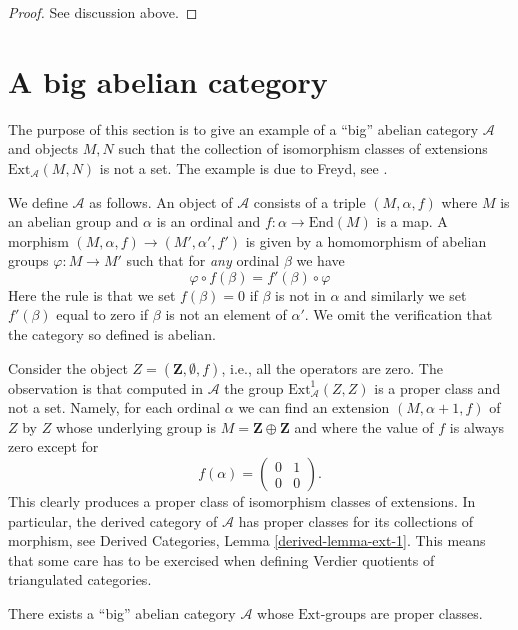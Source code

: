 \begin{proof}
See discussion above.
\end{proof}



\section{A big abelian category}
\label{section-big}

\noindent
The purpose of this section is to give an example of a ``big'' abelian category
$\mathcal{A}$ and objects $M, N$ such that the collection of isomorphism
classes of extensions $\text{Ext}_\mathcal{A}(M, N)$ is not a set.
The example is due to Freyd, see \cite[page 131, Exercise A]{Freyd}.

\medskip\noindent
We define $\mathcal{A}$ as follows. An object of $\mathcal{A}$
consists of a triple $(M, \alpha, f)$ where $M$ is an abelian group and
$\alpha$ is an ordinal and $f : \alpha \to \text{End}(M)$ is a map.
A morphism $(M, \alpha, f) \to (M', \alpha', f')$ is given by a homomorphism
of abelian groups $\varphi : M \to M'$ such that for {\it any} ordinal $\beta$
we have
$$
\varphi \circ f(\beta) = f'(\beta) \circ \varphi
$$
Here the rule is that we set $f(\beta) = 0$ if $\beta$ is not in
$\alpha$ and similarly we set $f'(\beta)$ equal to zero if $\beta$ is not an
element of $\alpha'$. We omit the verification that the category so defined
is abelian.

\medskip\noindent
Consider the object $Z = (\mathbf{Z}, \emptyset, f)$, i.e., all the
operators are zero. The observation is that computed in
$\mathcal{A}$ the group $\text{Ext}^1_\mathcal{A}(Z, Z)$ is a proper class
and not a set. Namely, for each ordinal $\alpha$ we can find an extension
$(M, \alpha + 1, f)$ of $Z$ by $Z$ whose underlying group is
$M = \mathbf{Z} \oplus \mathbf{Z}$ and where the value of $f$ is
always zero except for
$$
f(\alpha) =
\left(
\begin{matrix}
0 & 1 \\
0 & 0
\end{matrix}
\right).
$$
This clearly produces a proper class of isomorphism classes of extensions.
In particular, the derived category of $\mathcal{A}$ has proper classes for
its collections of morphism, see
Derived Categories, Lemma \ref{derived-lemma-ext-1}. This means that some
care has to be exercised when defining Verdier quotients of triangulated
categories.

\begin{lemma}
\label{lemma-big-abelian-category}
There exists a ``big'' abelian category $\mathcal{A}$ whose
$\text{Ext}$-groups are proper classes.
\end{lemma}

